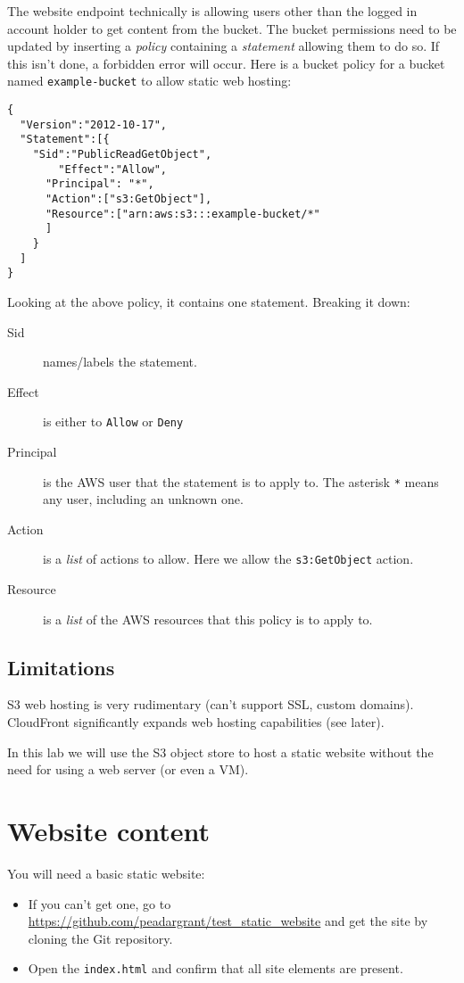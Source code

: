 \documentclass{pgnotes}
\begin{document}
The website endpoint technically is allowing users other than the logged in account holder to get content from the bucket.
The bucket permissions need to be updated by inserting a \textit{policy} containing a \textit{statement} allowing them to do so.
If this isn't done, a forbidden error will occur.
Here is a bucket policy for a bucket named \texttt{example-bucket} to allow static web hosting:
\begin{verbatim}
{
  "Version":"2012-10-17",
  "Statement":[{
	"Sid":"PublicReadGetObject",
        "Effect":"Allow",
	  "Principal": "*",
      "Action":["s3:GetObject"],
      "Resource":["arn:aws:s3:::example-bucket/*"
      ]
    }
  ]
}
\end{verbatim}
Looking at the above policy, it contains one statement. Breaking it down:
\begin{description}
\item[Sid] names/labels the statement.
\item[Effect] is either to \texttt{Allow} or \texttt{Deny}
\item[Principal] is the AWS user that the statement is to apply to. The asterisk \texttt{*} means any user, including an unknown one.
\item[Action] is a \textit{list} of actions to allow.  Here we allow the \texttt{s3:GetObject} action.
\item[Resource] is a \textit{list} of the AWS resources that this policy is to apply to. 
\end{description}


\subsection{Limitations}

S3 web hosting is very rudimentary (can't support SSL, custom domains).
CloudFront significantly expands web hosting capabilities (see later).


In this lab we will use the S3 object store to host a static website without the need for using a web server (or even a VM).

\section{Website content}

You will need a basic static website:
\begin{itemize}
\item If you can't get one, go to \url{https://github.com/peadargrant/test_static_website} and get the site by cloning the Git repository.
\item Open the \texttt{index.html} and confirm that all site elements are present.
\end{itemize}
  
\end{document}

